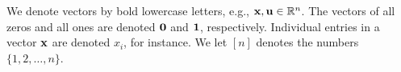 \vfill
{}
We denote vectors by bold lowercase letters, e.g., $\mathbf{x}, \mathbf{u} \in \mathbb{R}^n$.
The vectors of all zeros and all ones are denoted $\mathbf{0}$ and $\mathbf{1}$, respectively.
Individual entries in a vector $\mathbf{x}$ are denoted $x_i$, for instance.
We let $[n]$ denotes the numbers $\{1,2,\dots,n\}$.
